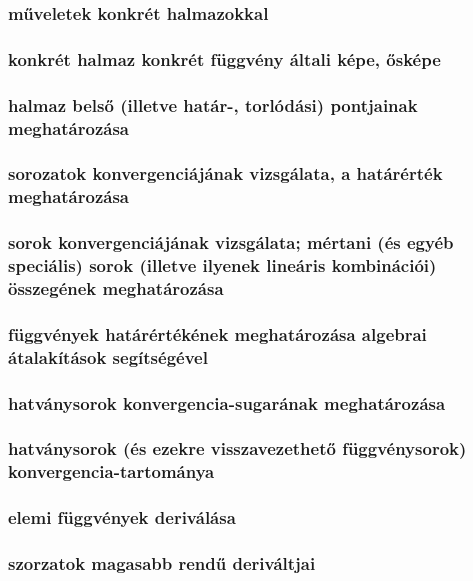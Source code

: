 \documentclass[12pt]{article}
\begin{document}
\subsubsection{műveletek konkrét halmazokkal}
\subsubsection{konkrét halmaz konkrét függvény általi képe, ősképe}
\subsubsection{halmaz belső (illetve határ-, torlódási) pontjainak meghatározása}
\subsubsection{sorozatok konvergenciájának vizsgálata, a határérték meghatározása}
\subsubsection{sorok konvergenciájának vizsgálata; mértani (és egyéb speciális) sorok (illetve
ilyenek lineáris kombinációi) összegének meghatározása}
\subsubsection{függvények határértékének meghatározása algebrai átalakítások segítségével}
\subsubsection{hatványsorok konvergencia-sugarának meghatározása}
\subsubsection{hatványsorok (és ezekre
visszavezethető függvénysorok) konvergencia-tartománya}
\subsubsection{elemi függvények deriválása}
\subsubsection{szorzatok magasabb rendű deriváltjai}
\end{document}
